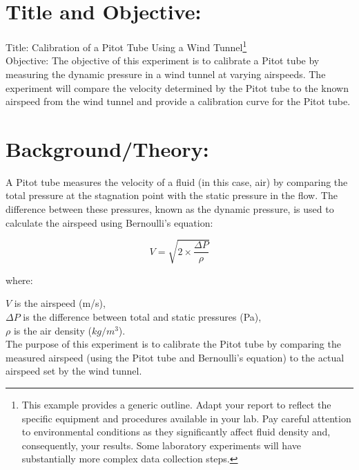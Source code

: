 \documentclass[12pt]{article}
\begin{document}
\section{Title and Objective:}

Title: Calibration of a Pitot Tube Using a Wind Tunnel\footnote{This example provides a generic outline. Adapt your report to reflect the specific equipment and procedures available in your lab.
Pay careful attention to environmental conditions as they significantly affect fluid density and, consequently, your results. Some laboratory experiments will have substantially more complex data collection steps.}\\

Objective: The objective of this experiment is to calibrate a Pitot tube by measuring the dynamic pressure in a wind tunnel at varying airspeeds. The experiment will compare the velocity determined by the Pitot tube to the known airspeed from the wind tunnel and provide a calibration curve for the Pitot tube. \\

\section{Background/Theory:}
A Pitot tube measures the velocity of a fluid (in this case, air) by comparing the total pressure at the stagnation point with the static pressure in the flow. The difference between these pressures, known as the dynamic pressure, is used to calculate the airspeed using Bernoulli’s equation:

\begin{equation}
V=\sqrt{2 \times \frac{\Delta P}{\rho}}
\end{equation}

where:

    $V$ is the airspeed (m/s),\\
    $\Delta P$ is the difference between total and static pressures (Pa),\\
    $\rho$ is the air density ($kg/m^3$).\\

The purpose of this experiment is to calibrate the Pitot tube by comparing the measured airspeed (using the Pitot tube and Bernoulli’s equation) to the actual airspeed set by the wind tunnel.
\clearpage
\end{document}
